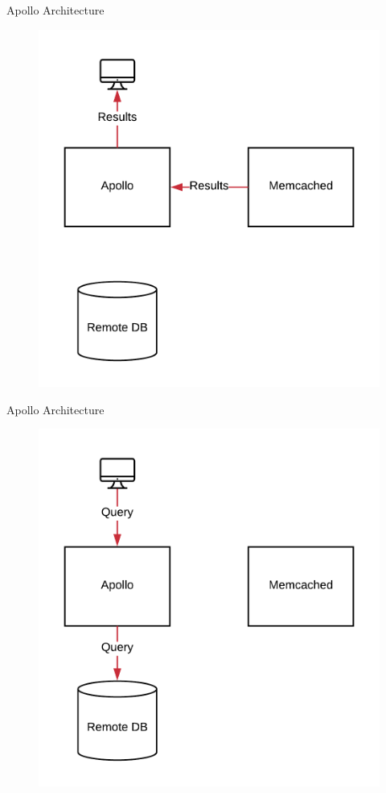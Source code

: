 \documentclass[10pt]{beamer}
\begin{document}
\begin{frame}[fragile]{Apollo Architecture}
    \begin{figure}
        \includegraphics[scale=0.17]{apollo_arch_diagram_3}
    \end{figure}
\end{frame}

\begin{frame}[fragile]{Apollo Architecture}
    \begin{figure}
        \includegraphics[scale=0.17]{apollo_arch_diagram_5}
    \end{figure}
\end{frame}
\end{document}
